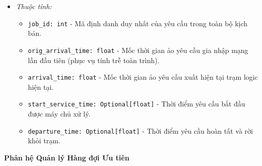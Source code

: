 \begin{itemize}[leftmargin=1.5em, itemsep=8pt]
\begin{itemize}[leftmargin=1.2em, label={}, itemsep=3pt]
\item[\textendash] \textit{Thuộc tính:}
\begin{itemize}[leftmargin=1.5em, label=+, itemsep=2pt]
\item \texttt{job\_id: int} - Mã định danh duy nhất của yêu cầu trong toàn bộ kịch bản.
\item \texttt{orig\_arrival\_time: float} - Mốc thời gian ảo yêu cầu gia nhập mạng lần đầu tiên (phục vụ tính trễ toàn trình).
\item \texttt{arrival\_time: float} - Mốc thời gian ảo yêu cầu xuất hiện tại trạm logic hiện tại.
\item \texttt{start\_service\_time: Optional[float]} - Thời điểm yêu cầu bắt đầu được máy chủ xử lý.
\item \texttt{departure\_time: Optional[float]} - Thời điểm yêu cầu hoàn tất và rời khỏi trạm.
\end{itemize}
\end{itemize}
\end{itemize}

\textbf{\color{red}Phân hệ Quản lý Hàng đợi Ưu tiên}

